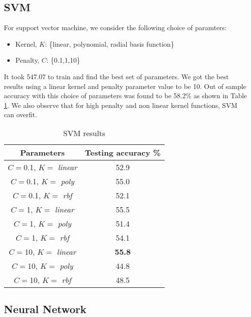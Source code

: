 \documentclass{article}
\begin{document}
\subsection{SVM} For support vector machine, we consider the following choice of paramters:
\begin{itemize}
	\item Kernel, $K$: \{linear, polynomial, radial basis function\}
	\item Penalty, $C$: \{0.1,1,10\}
\end{itemize}

It took 547.07 to train and find the best set of parameters. We got the best results using a linear kernel and penalty parameter value to be 10. Out of sample accuracy with this choice of parameters was found to be 58.2\% as shown in Table \ref{tab:svm}. We also observe that for high penalty and non linear kernel functions, SVM can overfit.

\begin{table}
	\caption{SVM results}
	\label{tab:svm}
	\centering
	\begin{tabular}{c|c}
	\toprule
	\textbf{Parameters} & \textbf{Testing accuracy \%} \\
	\midrule
	$C=$0.1, $K=$ \textit{linear} & 52.9 \\
	$C=$0.1, $K=$ \textit{poly} & 55.0\\
	$C=$0.1, $K=$ \textit{rbf} & 52.1\\
	$C=$1, $K=$ \textit{linear} & 55.5\\
	$C=$1, $K=$ \textit{poly} & 51.4\\
	$C=$1, $K=$ \textit{rbf} & 54.1\\
	$C=$10, $K=$ \textit{linear} &\textbf{ 55.8}\\
	$C=$10, $K=$ \textit{poly} & 44.8\\
	$C=$10, $K=$ \textit{rbf} & 48.5\\
	\bottomrule
\end{tabular}
\end{table}

\subsection{Neural Network}
\end{document}
